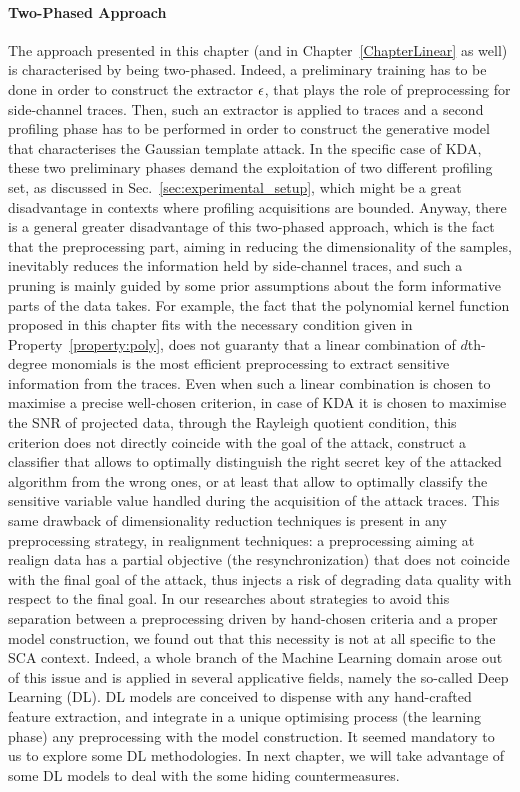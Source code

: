\paragraph*{Two-Phased Approach}
The approach presented in this chapter (and in Chapter~\ref{ChapterLinear} as well) is characterised by being two-phased. Indeed, a preliminary training has to be done in order to construct the extractor $\epsilon$, that plays the role of preprocessing for side-channel traces. Then, such an extractor is applied to traces and a second profiling phase has to be performed in order to construct the generative model that characterises the Gaussian template attack. In the specific case of KDA, these two preliminary phases demand the exploitation of two different profiling set, as discussed in Sec.~\ref{sec:experimental_setup}, which might be a great disadvantage in contexts where profiling acquisitions are bounded. Anyway, there is a general greater disadvantage of this two-phased approach, which is the fact that the preprocessing part, aiming in reducing the dimensionality of the samples, inevitably reduces the information held by side-channel traces, and such a pruning is mainly guided by some prior assumptions about the form informative parts of the data takes. For example, the fact that the polynomial kernel function proposed in this chapter fits with the necessary condition given in Property~\ref{property:poly}, does not guaranty that a linear combination of $d$th-degree monomials is the most efficient preprocessing to extract sensitive information from the traces. Even when such a linear combination is chosen to maximise a precise well-chosen criterion, in case of KDA it is chosen to maximise the SNR of projected data, through the Rayleigh quotient condition, this criterion does not directly coincide with the goal of the attack, \ie construct a classifier that allows to optimally distinguish the right secret key of the attacked algorithm from the wrong ones, or at least that allow to optimally classify the sensitive variable value handled during the acquisition of the attack traces. This same drawback of dimensionality reduction techniques is present in any preprocessing strategy, \eg in realignment techniques: a preprocessing aiming at realign data has a partial objective (the resynchronization) that does not coincide with the final goal of the attack, thus injects a risk of degrading data quality with respect to the final goal. In our researches about strategies to avoid this separation between a preprocessing driven by hand-chosen criteria and a proper model construction, we found out that this necessity is not at all specific to the SCA context. Indeed, a whole branch of the Machine Learning domain arose out of this issue and is applied in several applicative fields, namely the so-called Deep Learning (DL). DL models are conceived to dispense with any hand-crafted feature extraction, and integrate in a unique optimising process (the learning phase) any preprocessing with the model construction. It seemed mandatory to us to explore some DL methodologies. In next chapter, we will take advantage of some DL models to deal with the some hiding countermeasures.
